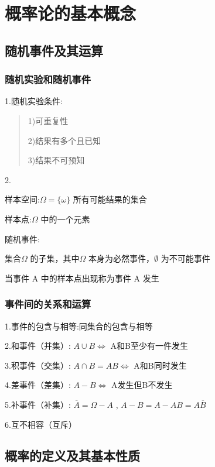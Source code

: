 \documentclass[11pt,twoside,a4paper]{ctexart}
\begin{document}
    \section{概率论的基本概念}
    \subsection{随机事件及其运算}
    \subsubsection{随机实验和随机事件}
    1.随机实验条件:


    \begin{quote}
        1)可重复性


        2)结果有多个且已知 

        
        3)结果不可预知 
    \end{quote}


    2.
    \begin{minipage}[t]{0.9\linewidth}
        样本空间:$\Omega = \{\omega \} $ 所有可能结果的集合

        样本点:$\Omega $ 中的一个元素

        随机事件:
        \begin{minipage}[t]{0.8\linewidth}
            集合$\Omega $ 的子集，其中$\Omega $ 本身为必然事件，$\emptyset $ 为不可能事件

            当事件 A 中的样本点出现称为事件 A 发生
        \end{minipage}
    \end{minipage}
    

    \subsubsection{事件间的关系和运算}
    1.事件的包含与相等:同集合的包含与相等

    2.和事件（并集）: $A \cup B \iff$ A和B至少有一件发生

    3.积事件（交集）: $A \cap  B = AB \iff$ A和B同时发生

    4.差事件（差集）: $A - B \iff$ A发生但B不发生

    5.补事件（补集）: $\overline{A} = \Omega - A $ , $A - B = A - AB = A\overline{B}$

    6.互不相容（互斥）
    \subsection{概率的定义及其基本性质}
\end{document}
